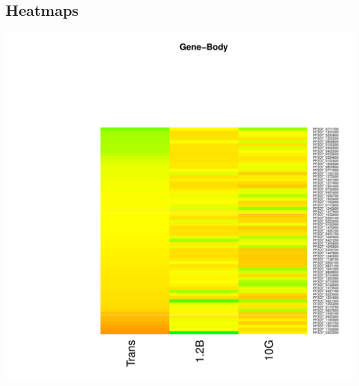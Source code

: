 \documentclass{article}\usepackage[]{graphicx}\usepackage[]{color}
\newenvironment{knitrout}{}{} %
\begin{document}
\subsection{Heatmaps}
\begin{knitrout}
\color{fgcolor}

{\centering \includegraphics[width=.9\linewidth]{figure/minimal-heat_difpeak_cov-1} 

}



\end{knitrout}
\clearpage
\end{document}
